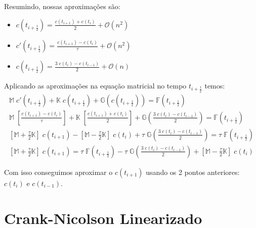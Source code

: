 \documentclass[a4paper]{article}
\begin{document}
Resumindo, nossas aproximações são:
\begin{itemize}
\item \(
    c(t_{i+\frac12})
    =
    \frac{c(t_{i+1}) + c(t_i)}{2}
    + \mathcal{O}(n^2)
\)
\item \(
    c'(t_{i+\frac12})
    =
    \frac{c(t_{i+1}) - c(t_i)}{\tau}
    + \mathcal{O}(n^2)
\)
\item \(
    c(t_{i+\frac12})
    =
    \frac{3 \; c(t_i) - c(t_{i-1})}{2}
    + \mathcal{O}(n)
\)
\end{itemize}

Aplicando as aproximações na equação matricial
no tempo \(t_{i+\frac12}\)
temos:
\[ \begin{array}{l} \displaystyle
    \mathbb{M} \; c'(t_{i+\frac12})
    + \mathbb{K} \; c(t_{i+\frac12})
    + \mathbb{G}(c(t_{i+\frac12}))
    = \mathbb{F}\left( t_{i+\frac12} \right)
    \\[3ex] \displaystyle
    \mathbb{M} \; \left[ \frac{c(t_{i+1}) - c(t_i)}{\tau} \right]
    + \mathbb{K} \; \left[ \frac{c(t_{i+1}) + c(t_i)}{2} \right]
    + \mathbb{G}\left( \frac{3 \; c(t_i) - c(t_{i-1})}{2} \right)
    = \mathbb{F}\left( t_{i+\frac12} \right)
    \\[3ex] \displaystyle
    \left[ \mathbb{M} + \frac\tau2 \mathbb{K} \right] \; c(t_{i+1})
    - \left[ \mathbb{M} - \frac\tau2 \mathbb{K} \right] \; c(t_i)
    + \tau \; \mathbb{G}\left( \frac{3 \; c(t_i) - c(t_{i-1})}{2} \right)
    = \tau \; \mathbb{F}\left( t_{i+\frac12} \right)
    \\[3ex] \displaystyle
    \left[ \mathbb{M} + \frac\tau2 \mathbb{K} \right] \; c(t_{i+1})
    = \tau \; \mathbb{F}\left( t_{i+\frac12} \right)
    - \tau \; \mathbb{G}\left( \frac{3 \; c(t_i) - c(t_{i-1})}{2} \right)
    + \left[ \mathbb{M} - \frac\tau2 \mathbb{K} \right] \; c(t_i)
\end{array} \]

Com isso conseguimos aproximar o
\(c(t_{i+1})\) usando os 2 pontos anteriores:
\(c(t_i)\) e \(c(t_{i-1})\).

\section{Crank-Nicolson Linearizado}
\end{document}
